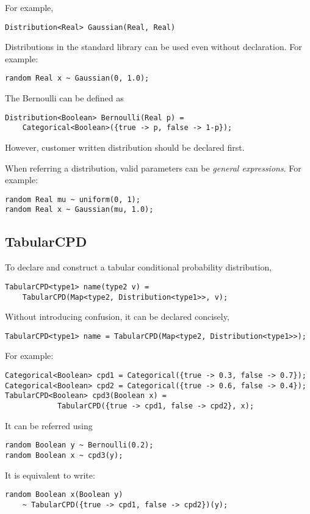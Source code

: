 \documentclass[12pt]{article}
\begin{document}
For example,
\begin{verbatim}
Distribution<Real> Gaussian(Real, Real)
\end{verbatim}

Distributions in the standard library can be used even without declaration. For example:
\begin{verbatim}
random Real x ~ Gaussian(0, 1.0);
\end{verbatim}

The Bernoulli can be defined as 
\begin{verbatim}
Distribution<Boolean> Bernoulli(Real p) = 
    Categorical<Boolean>({true -> p, false -> 1-p});
\end{verbatim}


However, customer written distribution should be declared first. 

When referring a distribution, valid parameters can be \emph{general expressions}.
For example:
\begin{verbatim}
random Real mu ~ uniform(0, 1);
random Real x ~ Gaussian(mu, 1.0);
\end{verbatim}


\subsection{TabularCPD}
To declare and construct a tabular conditional probability distribution, 
\begin{verbatim}
TabularCPD<type1> name(type2 v) = 
    TabularCPD(Map<type2, Distribution<type1>>, v);
\end{verbatim}
Without introducing confusion, it can be declared concisely,
\begin{verbatim}
TabularCPD<type1> name = TabularCPD(Map<type2, Distribution<type1>>);
\end{verbatim}

For example:
\begin{verbatim}
Categorical<Boolean> cpd1 = Categorical({true -> 0.3, false -> 0.7});
Categorical<Boolean> cpd2 = Categorical({true -> 0.6, false -> 0.4});
TabularCPD<Boolean> cpd3(Boolean x) = 
            TabularCPD({true -> cpd1, false -> cpd2}, x);
\end{verbatim}
It can be referred using 
\begin{verbatim}
random Boolean y ~ Bernoulli(0.2);
random Boolean x ~ cpd3(y);
\end{verbatim}
It is equivalent to write:
\begin{verbatim}
random Boolean x(Boolean y) 
    ~ TabularCPD({true -> cpd1, false -> cpd2})(y);
\end{verbatim}
\end{document}

